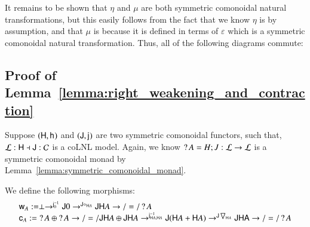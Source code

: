 It remains to be shown that $\eta$ and $\mu$ are both
symmetric comonoidal natural transformations, but this easily follows
from the fact that we know $\eta$ is by assumption, and that $\mu$
is because it is defined in terms of $\varepsilon$ which is a
symmetric comonoidal natural transformation.  Thus, all of the
following diagrams commute:

\subsection{Proof of Lemma~\ref{lemma:right_weakening_and_contraction}}
\label{subsec:proof_of_lemma:right_weakening_and_contraction}
Suppose $(\mathsf{H},\mathsf{h}_{})$ and $(\mathsf{J},\mathsf{j}_{})$ are two symmetric
  comonoidal functors, such that, $\mathcal{L} : \mathsf{H} \dashv \mathsf{J}
  : \mathcal{C}$ is a coLNL model.  Again, we know $\mathop{?} A = H;J : \mathcal{L}
  \rightarrow \mathcal{L}$ is a symmetric comonoidal monad by
  Lemma~\ref{lemma:symmetric_comonoidal_monad}.  
  
  We define the following morphisms:
  \[
  \begin{array}{lll}
    \mathsf{w}_{A} := \perp \rightarrow^{\mathsf{j}^{-1}_{0}} \mathsf{J} 0 \rightarrow^{\mathsf{J}\diamond_{\mathsf{H} A}} \mathsf{JH}A \rightarrow/=/ \mathop{?} A\\
    \mathsf{c}_{A} := \mathop{?} A \oplus \mathop{?} A \rightarrow/=/ \mathsf{JH}A \oplus \mathsf{JH}A \rightarrow^{\mathsf{j}^{-1}_{\mathsf{H}A,\mathsf{H}A}} \mathsf{J}(\mathsf{H}A + \mathsf{H}A) \rightarrow^{\mathsf{J}\bigtriangledown_{\mathsf{H}A}} \mathsf{JHA} \rightarrow/=/ \mathop{?} A
  \end{array}
  \]
  
